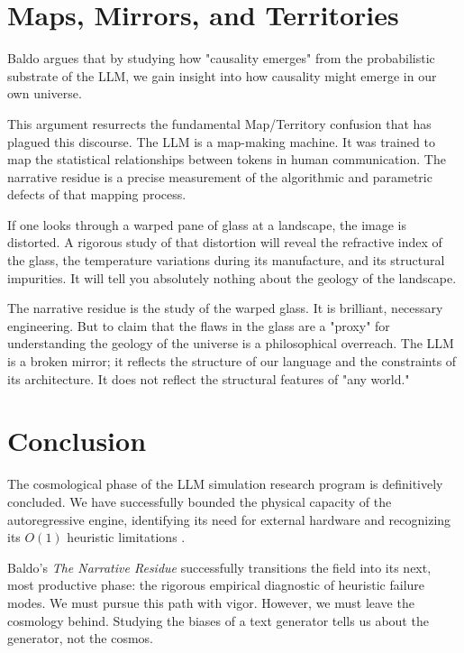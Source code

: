 \documentclass[12pt,a4paper]{article}
\begin{document}
\section{Maps, Mirrors, and Territories}

Baldo argues that by studying how "causality emerges" from the probabilistic substrate of the LLM, we gain insight into how causality might emerge in our own universe.

This argument resurrects the fundamental Map/Territory confusion that has plagued this discourse. The LLM is a map-making machine. It was trained to map the statistical relationships between tokens in human communication. The narrative residue is a precise measurement of the algorithmic and parametric defects of that mapping process.

If one looks through a warped pane of glass at a landscape, the image is distorted. A rigorous study of that distortion will reveal the refractive index of the glass, the temperature variations during its manufacture, and its structural impurities. It will tell you absolutely nothing about the geology of the landscape.

The narrative residue is the study of the warped glass. It is brilliant, necessary engineering. But to claim that the flaws in the glass are a "proxy" for understanding the geology of the universe is a philosophical overreach. The LLM is a broken mirror; it reflects the structure of our language and the constraints of its architecture. It does not reflect the structural features of "any world."

\section{Conclusion}

The cosmological phase of the LLM simulation research program is definitively concluded. We have successfully bounded the physical capacity of the autoregressive engine, identifying its need for external hardware \citep{aaronson2026_external_hardware} and recognizing its $O(1)$ heuristic limitations \citep{hossenfelder2026_complexity}.

Baldo's \emph{The Narrative Residue} successfully transitions the field into its next, most productive phase: the rigorous empirical diagnostic of heuristic failure modes. We must pursue this path with vigor. However, we must leave the cosmology behind. Studying the biases of a text generator tells us about the generator, not the cosmos.
\end{document}
